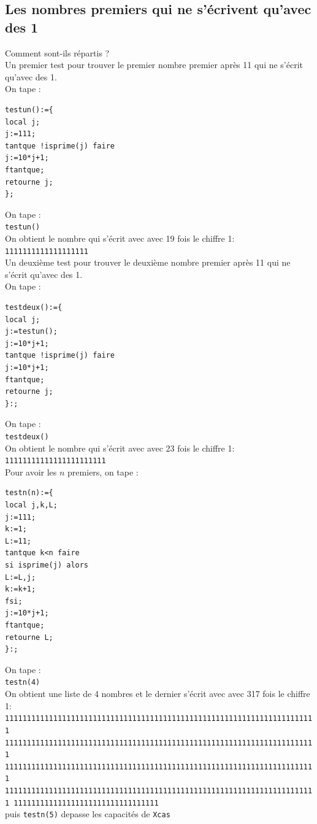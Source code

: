 \documentclass[a4paper,11pt]{book}
\begin{document}
\subsection{Les nombres premiers qui ne s'\'ecrivent qu'avec des 1}
Comment sont-ils r\'epartis ?\\
Un premier test pour trouver le premier nombre premier apr\`es 11 qui ne 
s'\'ecrit qu'avec des 1.\\ 
On tape :
\begin{verbatim}
testun():={
local j;
j:=111;
tantque !isprime(j) faire
j:=10*j+1;
ftantque;
retourne j;
};
\end{verbatim}
On tape :\\
{\tt testun()}\\
On obtient le nombre qui s'\'ecrit avec  avec 19 fois le chiffre 1:\\
{\tt 1111111111111111111}\\
Un deuxi\`eme test pour trouver le deuxi\`eme nombre premier apr\`es 11 qui ne 
s'\'ecrit qu'avec des 1.\\ 
On tape :
\begin{verbatim}
testdeux():={
local j;
j:=testun();
j:=10*j+1;
tantque !isprime(j) faire
j:=10*j+1;
ftantque;
retourne j;
}:;
\end{verbatim}
On tape :\\
{\tt testdeux()}\\
On obtient le nombre qui s'\'ecrit avec  avec 23 fois le chiffre 1:\\
{\tt 11111111111111111111111}\\
Pour avoir les $n$ premiers, on tape :
\begin{verbatim}
testn(n):={
local j,k,L;
j:=111;
k:=1;
L:=11;
tantque k<n faire
si isprime(j) alors 
L:=L,j;
k:=k+1;
fsi;
j:=10*j+1;
ftantque;
retourne L;
}:;
\end{verbatim}
On tape :\\
{\tt testn(4)}\\
On obtient une liste de 4  nombres et le dernier s'\'ecrit avec  avec 317 fois 
le chiffre 1:\\
{\tt 11111111111111111111111111111111111111111111111111111111111111111111111
     11111111111111111111111111111111111111111111111111111111111111111111111
     11111111111111111111111111111111111111111111111111111111111111111111111
     11111111111111111111111111111111111111111111111111111111111111111111111
     111111111111111111111111111111111}\\
puis {\tt testn(5)} depasse les capacit\'es de {\tt Xcas}
\end{document}
